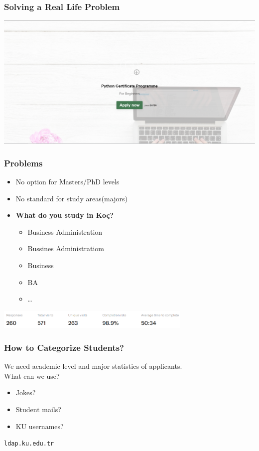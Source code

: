     \begin{frame}
        \frametitle{Solving a Real Life Problem}
        \pause
        \includegraphics[height=0.7\textheight]{images/typeform.PNG}
    \end{frame}

    \begin{frame}
        \frametitle{Problems}
        \LARGE
        \pause
        \begin{itemize}
            \item No option for Masters/PhD levels
            \pause
            \item No standard for study areas(majors)
            \pause
            \item \textbf{What do you study in Koç?}
            \pause
            \begin{itemize}
                \large
                \item Business Administration
                \pause
                \item Bussines Administratiom
                \pause
                \item Business
                \pause
                \item BA
                \pause
                \item \dots
            \end{itemize}
        \end{itemize}
        \pause
        \includegraphics[width=0.7\textwidth]{images/stats.PNG}
    \end{frame}

    \begin{frame}
        \frametitle{How to Categorize Students?}
        \LARGE
        We need academic level and major statistics of applicants.\\
        \pause 
        What can we use?
        \begin{itemize}
            \pause
            \item Jokes?
            \pause
            \item Student mails?
            \pause
            \item KU usernames?
        \end{itemize}
        \pause
        \texttt{ldap.ku.edu.tr}
    \end{frame}

